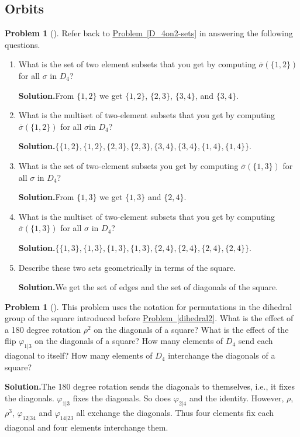 \documentclass[10pt,]{book}
\theoremstyle{plain}
\theoremstyle{definition}
\newtheorem{activity}[project]{Problem}
\theoremstyle{definition}
\numberwithin{equation}{chapter}
\begin{document}
\subsection[{Orbits}]{Orbits}\label{subsection-58}
\begin{activity}[]\label{orbits1}
Refer back to \hyperref[D_4on2-sets]{Problem~\ref{D_4on2-sets}} in answering the following questions.%
\begin{enumerate}[font=\bfseries,label=(\alph*),ref=\alph*]
\item\label{task-210} What is the set of two element subsets that you get by computing \(\overline{\sigma}(\{1,2\})\) for all \(\sigma\) in \(D_4\)?%
\par\medskip\noindent%
\textbf{Solution.}\quad From \(\{1,2\}\) we get \(\{1,2\}\), \(\{2,3\}\), \(\{3,4\}\), and \(\{3,4\}\).%
\item\label{task-211} What is the multiset of two-element subsets that you get by computing \(\overline{\sigma}(\{1,2\})\) for all \(\sigma\)in \(D_4\)?%
\par\medskip\noindent%
\textbf{Solution.}\quad \(\{\{1, 2\}, \{1, 2\}, \{2, 3\}, \{2, 3\}, \{3, 4\}, \{3, 4\}, \{1, 4\}, \{1, 4\}\}\).%
\item\label{task-212} What is the set of two-element subsets you get by computing \(\overline{\sigma}(\{1,3\})\) for all \(\sigma\) in \(D_4\)?%
\par\medskip\noindent%
\textbf{Solution.}\quad From \(\{1,3\}\) we get \(\{1,3\}\) and \(\{2,4\}\).%
\item\label{task-213} What is the multiset of two-element subsets that you get by computing \(\overline{\sigma}(\{1,3\})\) for all \(\sigma\) in \(D_4\)?%
\par\medskip\noindent%
\textbf{Solution.}\quad \(\{\{1, 3\}, \{1, 3\}, \{1, 3\}, \{1, 3\}, \{2, 4\}, \{2, 4\}, \{2, 4\}, \{2, 4\}\}\).%
\item\label{task-214} Describe these two sets geometrically in terms of the square.%
\par\medskip\noindent%
\textbf{Solution.}\quad We get the set of edges and the set of diagonals of the square.%
\end{enumerate}
\end{activity}
\begin{activity}[]\label{activity-288}
This problem uses the notation for permutations in the dihedral group of the square introduced before \hyperref[dihedral2]{Problem~\ref{dihedral2}}. What is the effect of a 180 degree rotation \(\rho^2\) on the diagonals of a square? What is the effect of the flip \(\varphi_{1|3}\) on the diagonals of a square? How many elements of \(D_4\) send each diagonal to itself? How many elements of \(D_4\) interchange the diagonals of a square?%
\par\medskip\noindent%
\textbf{Solution.}\quad The 180 degree rotation sends the diagonals to themselves, i.e.\@, it fixes the diagonals.  \(\varphi_{1|3}\) fixes the diagonals. So does \(\varphi_{2|4}\) and the identity. However, \(\rho\), \(\rho^3\), \(\varphi_{12|34}\) and \(\varphi_{14|23}\) all exchange the diagonals. Thus four elements fix each diagonal and four elements interchange them.%
\end{activity}
\end{document}
